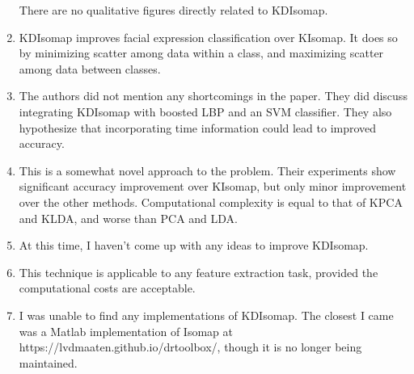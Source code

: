 \documentclass[11pt]{article}
\begin{document}
\begin{enumerate}
        There are no qualitative figures directly related to KDIsomap.

    \item KDIsomap improves facial expression classification over KIsomap. It
        does so by minimizing scatter among data within a class, and maximizing
        scatter among data between classes.

    \item The authors did not mention any shortcomings in the paper. They did
        discuss integrating KDIsomap with boosted LBP and an SVM classifier.
        They also hypothesize that incorporating time information could lead to
        improved accuracy.

    \item This is a somewhat novel approach to the problem. Their experiments
        show significant accuracy improvement over KIsomap, but only minor
        improvement over the other methods. Computational complexity is equal to
        that of KPCA and KLDA, and worse than PCA and LDA.

    \item At this time, I haven't come up with any ideas to improve KDIsomap.

    \item This technique is applicable to any feature extraction task, provided
        the computational costs are acceptable.

    \item I was unable to find any implementations of KDIsomap. The closest I
        came was a Matlab implementation of Isomap at
        https://lvdmaaten.github.io/drtoolbox/, though it is no longer being
        maintained.
\end{enumerate}



\end{document}
